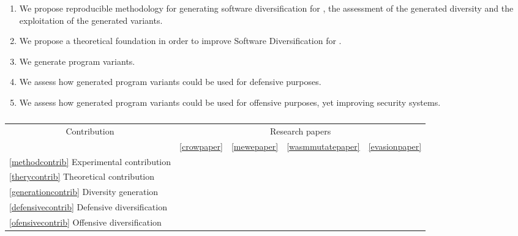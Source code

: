 
\begin{enumerate}[label=\textbf{C\arabic*}, ref=C\arabic*]
	\item \label{methodcontrib}  We propose reproducible methodology for generating software diversification for \Wasm, the assessment of the generated diversity and the exploitation of the generated variants.
	
	\item \label{therycontrib}  We propose a theoretical foundation in order to improve Software Diversification for \Wasm.
	
	\item \label{generationcontrib}  We generate \Wasm program variants.
	
	\item \label{defensivecontrib}  We assess how generated \Wasm program variants could be used for defensive purposes.
	
	\item \label{ofensivecontrib}  We assess how generated \Wasm program variants could be used for offensive purposes, yet improving security systems.
	
\end{enumerate}

\begin{table}
	\centering
	\begin{tabular}{l | l l l l }
		\multicolumn{1}{c|}{Contribution} & \multicolumn{4}{c}{Research papers} 
		\\
		&  \ref{crowpaper} & \ref{mewepaper} & \ref{wasmmutatepaper} & \ref{evasionpaper} \\
		\hline
		\ref{methodcontrib} Experimental contribution & \checkmark & \checkmark & \checkmark & \checkmark \\
		\ref{therycontrib} Theoretical contribution  & \checkmark &  &  \checkmark &  \\
		\ref{generationcontrib} Diversity generation   & \checkmark & \checkmark & \checkmark & \checkmark\\
		\ref{defensivecontrib} Defensive diversification   & \checkmark & \checkmark & \checkmark\\
		\ref{ofensivecontrib} Offensive diversification  & & & & \checkmark\\
	\end{tabular}
	\label{contribmap}
	\caption{}
\end{table}

